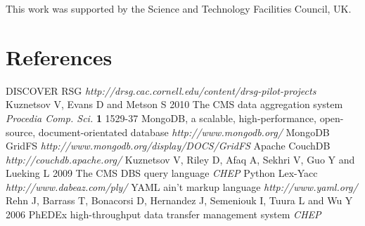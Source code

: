 \documentclass[a4paper]{jpconf}
\begin{document}
This work was supported by the Science and Technology Facilities Council, UK.

\appendix

\section*{References}
\begin{thebibliography}{9}
 DISCOVER RSG {\it http://drsg.cac.cornell.edu/content/drsg-pilot-projects}
 Kuznetsov V, Evans D and Metson S 2010 The CMS data aggregation system {\it Procedia Comp. Sci.} {\bf 1} 1529-37
 MongoDB, a scalable, high-performance, open-source, document-orientated database {\it http://www.mongodb.org/}
 MongoDB GridFS {\it http://www.mongodb.org/display/DOCS/GridFS}
 Apache CouchDB {\it http://couchdb.apache.org/}
 Kuznetsov V, Riley D, Afaq A, Sekhri V, Guo Y and Lueking L 2009 The CMS DBS query language {\it CHEP}
 Python Lex-Yacc {\it http://www.dabeaz.com/ply/}
 YAML ain't markup language {\it http://www.yaml.org/}
 Rehn J, Barrass T, Bonacorsi D, Hernandez J, Semeniouk I, Tuura L and Wu Y 2006 PhEDEx high-throughput data transfer management system {\it CHEP}
\end{thebibliography}
\end{document}
